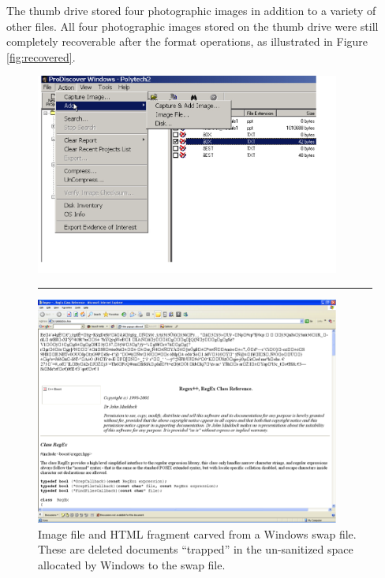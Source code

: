 

The thumb drive stored four photographic images in
addition to a variety of other files.  All four photographic images
stored on the thumb drive were still completely recoverable after the
format operations, as illustrated in Figure \ref{fig:recovered}.

\begin{figure}[ht]
\center
\includegraphics[width=100mm]{ch-carving/imageinswap.png}
\vspace{3mm}
\noindent\rule{60mm}{1pt}
\vspace{3mm}
\includegraphics[width=100mm]{ch-carving/cacheinswap.png}
\caption{Image file and HTML fragment carved from a Windows swap file.  These are deleted documents ``trapped'' in the un-sanitized space allocated by Windows to the swap file.}
\label{fig:insideswapfile}
\end{figure}

